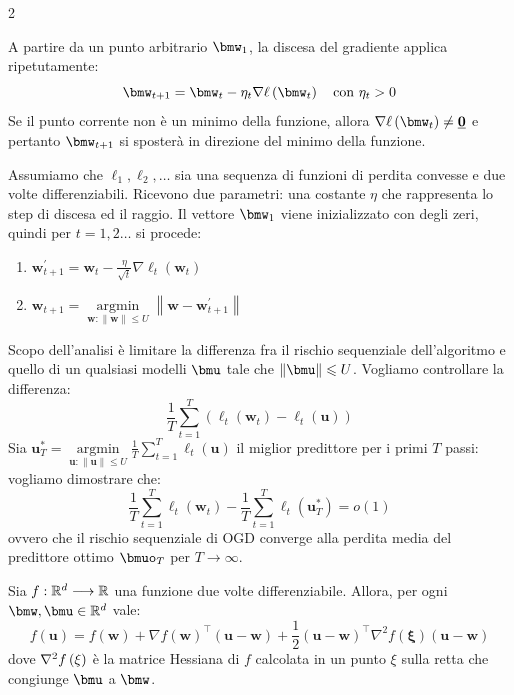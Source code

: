 \documentclass[\main/main.tex]{subfiles}
\begin{document}
\begin{multicols}{2}
\begin{definition}
    A partire da un punto arbitrario \(\bmw_1\), la discesa del gradiente applica ripetutamente:
    \[
        \bmw_{t+1} = \bmw_t - \eta_t\nabla\ell\rnd{\bmw_t} \quad \text{con }\eta_t>0
    \]
    Se il punto corrente non è un minimo della funzione, allora \(\nabla\ell\rnd{\bmw_t} \neq \bm{0}\) e pertanto \(\bmw_{t+1}\) si sposterà in direzione del minimo della funzione.
\end{definition}
\begin{definition}
    Assumiamo che \(\ell_1, \ell_2, \ldots\) sia una sequenza di funzioni di perdita convesse e due volte differenziabili. Ricevono due parametri: una costante \(\eta\) che rappresenta lo step di discesa ed il raggio. Il vettore \(\bmw_1\) viene inizializzato con degli zeri, quindi per \(t=1,2\ldots\) si procede:
    \begin{enumerate}
        \item \(\boldsymbol{w}_{t+1}^{\prime}=\boldsymbol{w}_{t}-\frac{\eta}{\sqrt{t}} \nabla \ell_{t}\left(\boldsymbol{w}_{t}\right)\)
        \item \(\boldsymbol{w}_{t+1}=\underset{\boldsymbol{w} :\|\boldsymbol{w}\| \leq U}{\operatorname{argmin}}\left\|\boldsymbol{w}-\boldsymbol{w}_{t+1}^{\prime}\right\|\)
    \end{enumerate}
\end{definition}
\begin{goal}
    Scopo dell'analisi è limitare la differenza fra il rischio sequenziale dell'algoritmo e quello di un qualsiasi modelli \(\bmu\) tale che \(\norm{\bmu}\leq U\). Vogliamo controllare la differenza:
    \[\frac{1}{T} \sum_{t=1}^{T}\left(\ell_{t}\left(\boldsymbol{w}_{t}\right)-\ell_{t}(\boldsymbol{u})\right)\]
    Sia \(\boldsymbol{u}_{T}^{*}=\underset{\boldsymbol{u} :\|\boldsymbol{u}\| \leq U}{\operatorname{argmin}} \frac{1}{T} \sum_{t=1}^{T} \ell_{t}(\boldsymbol{u})\) il miglior predittore per i primi \(T\) passi: vogliamo dimostrare che:
    \[\frac{1}{T} \sum_{t=1}^{T} \ell_{t}\left(\boldsymbol{w}_{t}\right)-\frac{1}{T} \sum_{t=1}^{T} \ell_{t}\left(\boldsymbol{u}_{T}^{*}\right)=o(1)\]
    ovvero che il rischio sequenziale di OGD converge alla perdita media del predittore ottimo \(\bmuo_T\) per \(T\rightarrow \infty\).
\end{goal}
\begin{lemma}
    Sia \(f:\mathbb{R}^d\longrightarrow \mathbb{R}\) una funzione due volte differenziabile. Allora, per ogni \(\bmw, \bmu \in \R^d\) vale:
    \[f(\boldsymbol{u})=f(\boldsymbol{w})+\nabla f(\boldsymbol{w})^{\top}(\boldsymbol{u}-\boldsymbol{w})+\frac{1}{2}(\boldsymbol{u}-\boldsymbol{w})^{\top} \nabla^{2} f(\boldsymbol{\xi})(\boldsymbol{u}-\boldsymbol{w})\]
    dove \(\nabla^2f\left(\xi\right)\) è la matrice Hessiana di \(f\) calcolata in un punto \(\xi\) sulla retta che congiunge \(\bmu\) a \(\bmw\).
\end{lemma}
\end{multicols}
\end{document}
